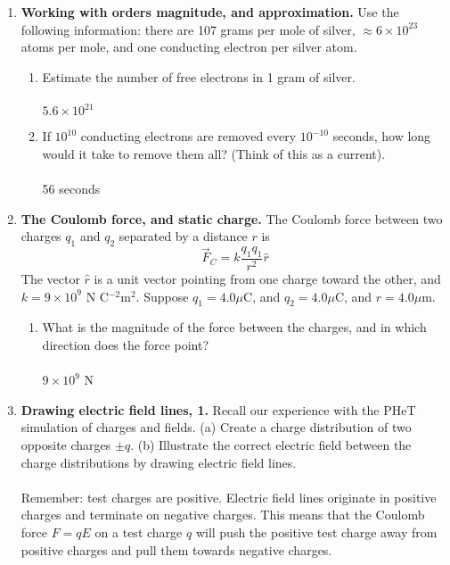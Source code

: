 \documentclass[10pt]{article}
\begin{document}
\maketitle

\begin{enumerate}
\item \textbf{Working with orders magnitude, and approximation.} Use the following information: there are 107 grams per mole of silver, $\approx 6 \times 10^{23}$ atoms per mole, and one conducting electron per silver atom. 
\begin{enumerate}
\item Estimate the number of free electrons in 1 gram of silver. \\ \\ $5.6 \times 10^{21}$ \\
\item If $10^{10}$ conducting electrons are removed every $10^{-10}$ seconds, how long would it take to remove them all? (Think of this as a current). \\ \\ 56 seconds \\
\end{enumerate}
\item \textbf{The Coulomb force, and static charge.} The Coulomb force between two charges $q_1$ and $q_2$ separated by a distance $r$ is 
\begin{equation}
 	\vec{F}_C = k\frac{q_1 q_1}{r^2}\hat{r}
\end{equation}
The vector $\hat{r}$ is a unit vector pointing from one charge toward the other, and $k = 9\times 10^9$ N C$^{-2}$m$^{2}$.  Suppose $q_1 = 4.0 \mu$C, and $q_2 = 4.0 \mu$C, and $r=4.0 \mu$m. \\
\begin{enumerate}
\item What is the magnitude of the force between the charges, and in which direction does the force point? \\ \\ $9 \times 10^9$ N \\
\end{enumerate}
\item \textbf{Drawing electric field lines, 1.} Recall our experience with the PHeT simulation of charges and fields.  (a) Create a charge distribution of two opposite charges $\pm q$. (b) Illustrate the correct electric field between the charge distributions by drawing electric field lines. \\ \\ Remember: test charges are positive.  Electric field lines originate in positive charges and terminate on negative charges.  This means that the Coulomb force $F = qE$ on a test charge $q$ will push the positive test charge away from positive charges and pull them towards negative charges. \\

\end{enumerate}
\end{document}
